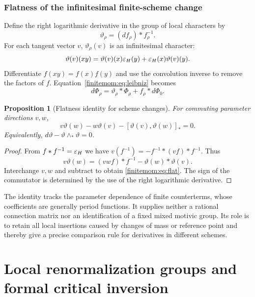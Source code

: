 \documentclass[11pt,a4paper,oneside]{article}
\theoremstyle{plain}
\newtheorem{proposition}[theorem]{Proposition}
\theoremstyle{definition}
\theoremstyle{remark}
\numberwithin{equation}{section}
\begin{document}
\subsubsection{Flatness of the infinitesimal finite-scheme change}
Define the right logarithmic derivative in the group of local characters by
\begin{equation}\label{finitemom:eq:connection}
 \vartheta_\rho=(df_\rho)*f_\rho^{-1}.
\end{equation}
For each tangent vector $v$, $\vartheta_\rho(v)$ is an infinitesimal character:
\begin{equation}\label{finitemom:eq:infchar}
 \vartheta(v)(xy)=\vartheta(v)(x)\varepsilon_H(y)
                              +\varepsilon_H(x)\vartheta(v)(y).
\end{equation}
Differentiate $f(xy)=f(x)f(y)$ and use the convolution inverse to remove the factors of $f$. Equation~\eqref{finitemom:eq:leibniz} becomes
\begin{equation}\label{finitemom:eq:gauge}
 d\Phi_\rho=\vartheta_\rho*\Phi_\rho+f_\rho*d\Phi_0.
\end{equation}
\begin{proposition}[Flatness identity for scheme changes]\label{finitemom:prop:flat}
For commuting parameter directions $v,w$,
\begin{equation}\label{finitemom:eq:flat}
 v\vartheta(w)-w\vartheta(v)
                   -[\vartheta(v),\vartheta(w)]_*=0.
\end{equation}
Equivalently, $d\vartheta-\vartheta\wedge_*\vartheta=0$.
\end{proposition}
\begin{proof}
From $f*f^{-1}=\varepsilon_H$ we have $v(f^{-1})=-f^{-1}*(vf)*f^{-1}$. Thus
\[
 v\vartheta(w)=(vwf)*f^{-1}-\vartheta(w)*\vartheta(v).
\]
Interchange $v,w$ and subtract to obtain \eqref{finitemom:eq:flat}. The sign of the commutator is determined by the use of the right logarithmic derivative.
\end{proof}
The identity tracks the parameter dependence of finite counterterms, whose coefficients are generally period functions. It supplies neither a rational connection matrix nor an identification of a fixed mixed motivic group. Its role is to retain all local insertions caused by changes of mass or reference point and thereby give a precise comparison rule for derivatives in different schemes.
\endgroup


\section{Local renormalization groups and formal critical inversion}\label{ch:rg}
\begingroup
\end{document}
